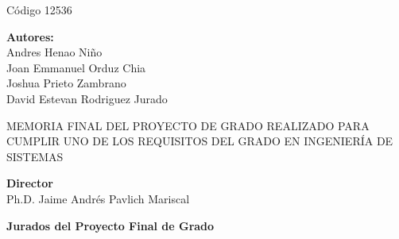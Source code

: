 \setcounter{page}{1}

    \begin{center}

        \large
        Código 12536 \\

        \vspace{0.5cm}
        \LARGE
        
        \large
        \thetitle
        
        \vspace{0.5cm}
        \LARGE


        \vspace{0.5cm}

        \large
        \textbf{Autores:}\\
        \vspace{0.2cm}
        Andres Henao Niño \\
        Joan Emmanuel Orduz Chia \\
        Joshua Prieto Zambrano \\
        David Estevan Rodriguez Jurado \\
        
        \vspace{0.5cm}
        \LARGE


        \large
        \vspace{0.5cm}
        MEMORIA FINAL DEL PROYECTO DE GRADO REALIZADO PARA CUMPLIR UNO DE LOS REQUISITOS DEL GRADO EN INGENIERÍA DE SISTEMAS \\

        \vspace{0.5cm}
        \LARGE


        \vspace{0.5cm}

        \large
        \textbf{Director}\\
        \vspace{0.2cm}
        Ph.D. Jaime Andrés Pavlich Mariscal\\

        \vspace{0.5cm}
        \LARGE


        \vspace{0.5cm}

        \large
        \textbf{Jurados del Proyecto Final de Grado}\\

        \vspace{0.5cm}
        \LARGE



\end{center}
